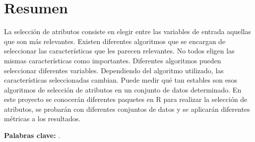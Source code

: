 \chapter*{Resumen}
\label{cha:resumen}


La selección de atributos consiste en elegir entre las variables de entrada aquellas que son más relevantes. Existen diferentes algoritmos que se encargan de seleccionar las características que les parecen relevantes. No todos eligen las mismas características como importantes. Diferentes algoritmos pueden seleccionar diferentes variables. Dependiendo del algoritmo utilizado, las características seleccionadas cambian. Puede medir qué tan estables son esos algoritmos de selección de atributos en un conjunto de datos determinado. En este proyecto se conocerán diferentes paquetes en R para realizar la selección de atributos, se probarán con diferentes conjuntos de datos y se aplicarán diferentes métricas a los resultados.

\textbf{Palabras clave:} \myThesisKeywords.